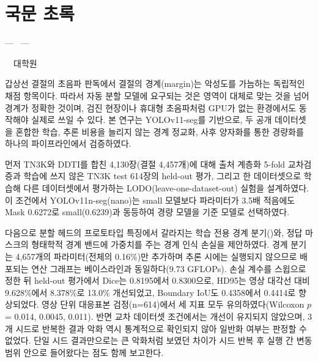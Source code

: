 \chapter*{국문 초록}

\begin{center}
{\large\bfseries \ThesisTitleKo\par}
{\normalsize --- \ThesisSubtitleKo\ ---\par}
\vspace{2mm}
{\normalsize \AuthorKo\quad \DepartmentKo\ \UniversityKo\ 대학원\par}
\end{center}
\vspace{4mm}

갑상선 결절의 초음파 판독에서 결절의 경계(margin)는 악성도를 가늠하는 독립적인 채점 항목이다.
따라서 자동 분할 모델에 요구되는 것은 영역이 대체로 맞는 것을 넘어 경계가 정확한 것이며,
검진 현장이나 휴대형 초음파처럼 GPU가 없는 환경에서도 동작해야 실제로 쓰일 수 있다.
본 연구는 YOLOv11-seg를 기반으로, 두 공개 데이터셋을 혼합한 학습, 추론 비용을 늘리지 않는
경계 정교화, 사후 양자화를 통한 경량화를 하나의 파이프라인에서 검증하였다.

먼저 TN3K와 DDTI를 합친 4,130장(결절 4,457개)에 대해 출처 계층화 5-fold 교차검증과
학습에 쓰지 않은 TN3K test 614장의 held-out 평가, 그리고 한 데이터셋으로 학습해 다른 데이터셋에서
평가하는 LODO(leave-one-dataset-out) 실험을 설계하였다. 이 조건에서 YOLOv11n-seg(nano)는
small 모델보다 파라미터가 3.5배 적음에도 Mask \mAP{} 0.6272로 small(0.6239)과 동등하여
경량 모델을 기준 모델로 선택하였다.

다음으로 분할 헤드의 프로토타입 특징에서 갈라지는 학습 전용 경계 분기(\BRM{})와,
정답 마스크의 형태학적 경계 밴드에 가중치를 주는 경계 인식 손실을 제안하였다.
경계 분기는 4,657개의 파라미터(전체의 0.16\%)만 추가하며 추론 시에는 실행되지 않으므로
배포되는 연산 그래프는 베이스라인과 동일하다(9.73 GFLOPs). 손실 계수를 스윕으로 정한 뒤
held-out 평가에서 Dice는 0.8195에서 0.8300으로, HD95는 영상 대각선 대비 9.628\%에서 8.378\%로
13.0\% 개선되었고, Boundary IoU도 0.4358에서 0.4414로 향상되었다. 영상 단위 대응표본 검정(n=614)에서
세 지표 모두 유의하였다(Wilcoxon $p$ = 0.014, 0.0045, 0.011). 반면 교차 데이터셋 조건에서는 개선이
유지되지 않았으며, 3개 시드로 반복한 결과 악화 역시 통계적으로 확인되지 않아
일반화 여부는 판정할 수 없었다. 단일 시드 결과만으로는 큰 악화처럼 보였던 차이가
시드 반복 후 실행 간 변동 범위 안으로 들어왔다는 점도 함께 보고한다.


